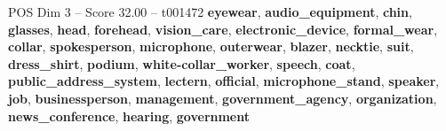 \begin{textsample}{POS Dim 3 – Score 32.00 – t001472}  \label{ex:f3_pos_015}
\textbf{eyewear}, \textbf{audio\_equipment}, \textbf{chin}, \textbf{glasses}, \textbf{head}, \textbf{forehead}, \textbf{vision\_care}, \textbf{electronic\_device}, \textbf{formal\_wear}, \textbf{collar}, \textbf{spokesperson}, \textbf{microphone}, \textbf{outerwear}, \textbf{blazer}, \textbf{necktie}, \textbf{suit}, \textbf{dress\_shirt}, \textbf{podium}, \textbf{white-collar\_worker}, \textbf{speech}, \textbf{coat}, \textbf{public\_address\_system}, \textbf{lectern}, \textbf{official}, \textbf{microphone\_stand}, \textbf{speaker}, \textbf{job}, \textbf{businessperson}, \textbf{management}, \textbf{government\_agency}, \textbf{organization}, \textbf{news\_conference}, \textbf{hearing}, \textbf{government}

\end{textsample}
